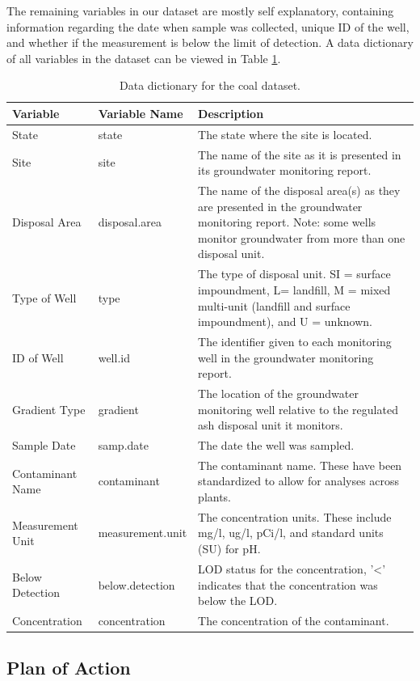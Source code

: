 \documentclass[12pt, twoside]{amherstthesis}
\begin{document}
The remaining variables in our dataset are mostly self explanatory, containing information regarding the date when sample was collected, unique ID of the well, and whether if the measurement is below the limit of detection. A data dictionary of all variables in the dataset can be viewed in Table \ref{tab:datadictionary}.
\begin{table}

\caption{\label{tab:datadictionary}Data dictionary for the coal dataset.}
\centering
\begin{tabular}[t]{ll>{\raggedright\arraybackslash}p{7.6cm}}
\toprule
Variable & Variable Name & Description\\
\midrule
State & state & The state where the site is located.\\
\addlinespace
Site & site & The name of the site as it is presented in its
             groundwater monitoring \vphantom{1} report.\\
\addlinespace
Disposal Area & disposal.area & The name of the disposal area(s) as they are presented 
             in the groundwater monitoring report. Note: some wells 
             monitor groundwater from more than one disposal unit.\\
\addlinespace
Type of Well & type & The type of disposal unit. SI = surface impoundment, 
             L= landfill, M = mixed multi-unit (landfill and surface 
             impoundment), and U = unknown.\\
\addlinespace
ID of Well & well.id & The identifier given to each monitoring well in the 
             groundwater monitoring report.\\
\addlinespace
Gradient Type & gradient & The location of the groundwater monitoring well 
             relative to the regulated ash disposal unit it 
             monitors.\\
\addlinespace
Sample Date & samp.date & The date the well was sampled.\\
\addlinespace
Contaminant Name & contaminant & The contaminant name. These have been standardized to 
             allow for analyses across plants.\\
\addlinespace
Measurement Unit & measurement.unit & The concentration units. These include mg/l, ug/l, 
             pCi/l, and standard units (SU) for pH.\\
\addlinespace
Below Detection & below.detection & LOD status for the concentration, '<' indicates that 
             the concentration was below the LOD.\\
\addlinespace
Concentration & concentration & The concentration of the contaminant.\\
\bottomrule
\end{tabular}
\end{table}
\hypertarget{plan-of-action}{%
\subsection{Plan of Action}\label{plan-of-action}}
\end{document}
